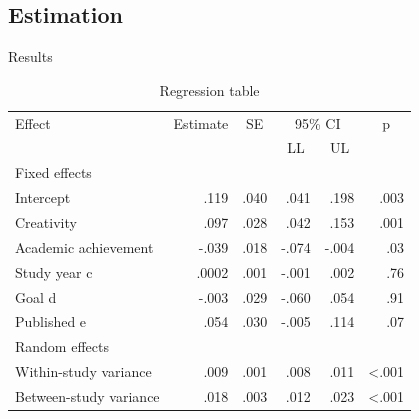 \documentclass[xcolor=table]{beamer}
\begin{document}
\subsection{Estimation}
\begin{frame}{Results}
    
    \begin{table}[]
        \small
        \caption{Regression table}
        \label{tab:my-table}
        \begin{tabular}{lrrrrr}
        \hline
        Effect        & \multicolumn{1}{c}{Estimate} & \multicolumn{1}{c}{SE} & \multicolumn{2}{c}{95\% CI}                     & \multicolumn{1}{c}{p} \\ \cline{4-5}
                      & \multicolumn{1}{l}{}         & \multicolumn{1}{l}{}   & \multicolumn{1}{c}{LL} & \multicolumn{1}{c}{UL} & \multicolumn{1}{l}{}  \\ \hline
        Fixed effects & \multicolumn{1}{l}{}         & \multicolumn{1}{l}{}   & \multicolumn{1}{l}{}   & \multicolumn{1}{l}{}   & \multicolumn{1}{l}{}  \\
        \hspace{3mm}Intercept                          & .119  & .040 & .041  & .198  & .003            \\
        \hspace{3mm}Creativity            & .097  & .028 & .042  & .153  & .001            \\
        \hspace{3mm}Academic achievement  & -.039 & .018 & -.074 & -.004 & .03             \\
        \hspace{3mm}Study year c                       & .0002 & .001 & -.001 & .002  & .76             \\
        \hspace{3mm}Goal d                             & -.003 & .029 & -.060 & .054  & .91             \\
        \hspace{3mm}Published e                        & .054  & .030 & -.005 & .114  & .07             \\
        Random effects                     &       &      &       &       &                 \\
        \hspace{3mm}Within-study variance              & .009  & .001 & .008  & .011  & \textless{}.001 \\
        \hspace{3mm}Between-study variance             & .018  & .003 & .012  & .023  & \textless{}.001 \\ \hline
        \end{tabular}
        \end{table}

\end{frame}
\end{document}

